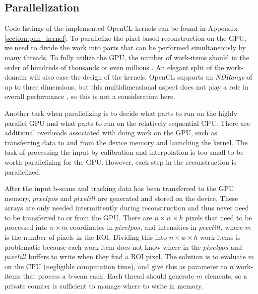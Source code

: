 \subsection{Parallelization}


Code listings of the implemented OpenCL kernels can be found in Appendix \ref{section:pnn_kernel}. To parallelize the pixel-based reconstruction on the GPU, we need to divide the work into parts that can be performed simultaneously by many threads. To fully utilize the GPU, the number of work-items should in the order of hundreds of thousands or even millions \cite{bestpractices}. An elegant split of the work-domain will also ease the design of the kernels. OpenCL supports an \textit{NDRange} of up to three dimensions, but this multidimensional aspect does not play a role in overall performance \cite{bestpractices}, so this is not a consideration here.

Another task when parallelizing is to decide what parts to run on the highly parallel GPU and what parts to run on the relatively sequential CPU. There are additional overheads associated with doing work on the GPU, such as transferring data to and from the device memory and launching the kernel. The task of processing the input by calibration and interpolation is too small to be worth parallelizing for the GPU. However, each step in the reconstruction is parallelized.

After the input b-scans and tracking data has been transferred to the GPU memory, $pixelpos$ and $pixelill$ are generated and stored on the device. These arrays are only needed intermittently during reconstruction and thus never need to be transferred to or from the GPU. There are $n \times w \times h$ pixels that need to be processed into $n \times m$ coordinates in $pixelpos$, and intensities in $pixelill$, where $m$ is the number of pixels in the ROI. Dividing this into $n \times w \times h$ work-items is problematic because each work-item does not know where in the $pixelpos$ and $pixelill$ buffers to write when they find a ROI pixel. The solution is to evaluate $m$ on the CPU (negligible computation time), and give this as parameter to $n$ work-items that process a b-scan each. Each thread should generate $m$ elements, so a private counter is sufficient to manage where to write in memory.

